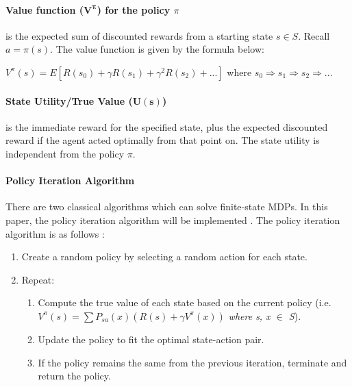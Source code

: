 \documentclass{article}
\begin{document}
\paragraph{Value function ($ \boldsymbol{V^\pi} $) for the policy $ \pi $} is the expected sum of discounted rewards from a starting state $ s \in S $. Recall $ a = \pi(s) $. The value function is given by the formula below:
\medskip

$ V^{\pi}(s) = E [ R(s_0) + \gamma R(s_1) + \gamma^2 R(s_2) + ... ] $ where $ s_0 \Rightarrow s_1 \Rightarrow s_2 \Rightarrow ... $

\begin{comment}
Note that the value function of a fixed policy satisfies the \href{https://en.wikipedia.org/wiki/Bellman_equation}{Bellman Equation}, i.e. $ V^{\pi}(s) = R(s) + \gamma \text{ } \sum_x P_{s(a = \pi(s))}(x) V^{\pi}(x) $ \textit{for every x $ \in $ S (the set of states)}.
\end{comment}

\paragraph{State Utility/True Value ($ \boldsymbol{U(s)} $)} is the immediate reward for the specified state, plus the expected discounted reward if the agent acted optimally from that point on. The state utility is independent from the policy $ \pi $.

\begin{comment} I.e. $ U(s) = R(s) + \gamma \text{ \textbf{max}}_a \sum_x P_{sa}(x) U(x) $ \textit{for every x $ \in $ S (the set of states)}.
\end{comment}

\paragraph{Policy Iteration Algorithm} There are two classical algorithms which can solve finite-state MDPs. In this paper, the policy iteration algorithm will be implemented \cite{bib-10}. The policy iteration algorithm is as follows :

\begin{enumerate}
	\item Create a random policy by selecting a random action for each state.
	\item Repeat:
	\begin{enumerate}
		\item Compute the true value of each state based on the current policy (i.e. $ V^\pi(s) = \sum P_{sa}(x)(R(s) + \gamma V^\pi(x)) $ \textit{where s, x $ \in $ S}).
		\item Update the policy to fit the optimal state-action pair.
		\item If the policy remains the same from the previous iteration, terminate and return the policy.
	\end{enumerate}
\end{enumerate}
\newpage
\end{document}
